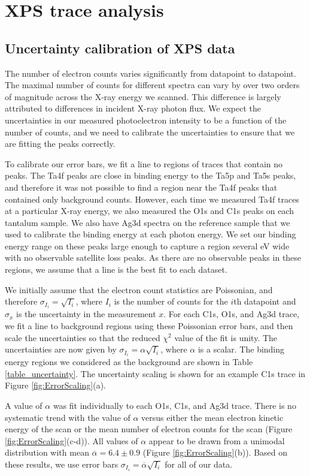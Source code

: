\documentclass{WileyMSP-template}
\begin{document}
\section{XPS trace analysis} \label{XPS_trace_analysis}
\subsection{Uncertainty calibration of XPS data}
The number of electron counts varies significantly from datapoint to datapoint. The maximal number of counts for different spectra can vary by over two orders of magnitude across the X-ray energy we scanned. This difference is largely attributed to differences in incident X-ray photon flux. We expect the uncertainties in our measured photoelectron intensity to be a function of the number of counts, and we need to  calibrate the uncertainties to ensure that we are fitting the peaks correctly.

To calibrate our error bars, we fit a line to regions of traces that contain no peaks. The Ta4f peaks are close in binding energy to the Ta5p and Ta5s peaks, and therefore it was not possible to find a region near the Ta4f peaks that contained only background counts. However, each time we measured Ta4f traces at a particular X-ray energy, we also measured the O1s and C1s peaks on each tantalum sample. We also have Ag3d spectra on the reference sample that we used to calibrate the binding energy at each photon energy. We set our binding energy range on these peaks large enough to capture a region several eV wide with no observable satellite loss peaks. As there are no observable peaks in these regions, we assume that a line is the best fit to each dataset.

We initially assume that the electron count statistics are Poissonian, and therefore $\sigma_{I_i} = \sqrt{I_i}$, where $I_i$ is the number of counts for the $i$th datapoint and $\sigma_x$ is the uncertainty in the measurement $x$. For each C1s, O1s, and Ag3d trace, we fit a line to background regions using these Poissonian error bars, and then scale the uncertainties so that the reduced $\chi^2$ value of the fit is unity. The uncertainties are now given by $\sigma_{I_i} = \alpha{}\sqrt{I_i}$, where $\alpha$ is a scalar. The binding energy regions we considered as the background are shown in Table \ref{table_uncertainty}. The uncertainty scaling is shown for an example C1s trace in Figure \ref{fig:ErrorScaling}(a).

A value of $\alpha$ was fit individually to each O1s, C1s, and Ag3d trace. There is no systematic trend with the value of $\alpha$ versus either the mean electron kinetic energy of the scan or the mean number of electron counts for the scan (Figure \ref{fig:ErrorScaling}(c-d)). All values of $\alpha$ appear to be drawn from a unimodal distribution with mean $\overline{\alpha} = 6.4\pm 0.9$ (Figure \ref{fig:ErrorScaling}(b)). Based on these results, we use error bars $\sigma_{I_i} = \overline{\alpha}\sqrt{I_i}$ for all of our data.
\end{document}
